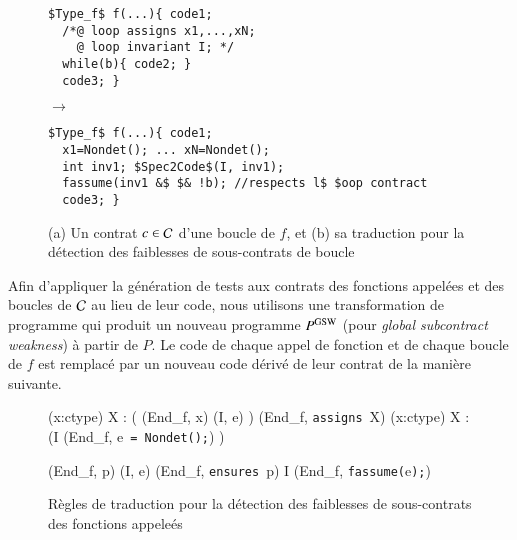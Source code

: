 \begin{figure*}[tb]
\begin{center}
\begin{minipage}{0.35\columnwidth}
\begin{lstlisting}[mathescape]
$Type_f$ f(...){ code1;
  /*@ loop assigns x1,...,xN;
    @ loop invariant I; */
  while(b){ code2; }
  code3; }
\end{lstlisting}
\end{minipage}
\hspace{-6mm}
\begin{minipage}{0.07\columnwidth}$\to$\end{minipage}
\begin{minipage}{0.55\columnwidth}
\begin{lstlisting}[mathescape]
$Type_f$ f(...){ code1;
  x1=Nondet(); ... xN=Nondet();
  int inv1; $Spec2Code$(I, inv1);
  fassume(inv1 &$ $& !b); //respects l$ $oop contract
  code3; }
\end{lstlisting}
\end{minipage}
\vspace{-3mm}
\caption{(a) Un contrat $c\in{\ensuremath\mathcal{C}}$ d'une boucle de $f$, et
(b) sa traduction pour la détection des faiblesses de sous-contrats de boucle}
\vspace{-3mm}
\label{fig:CW-transf-loops}
\end{center}
\end{figure*}

Afin d'appliquer la génération de tests aux contrats des fonctions appelées et
des boucles de ${\mathcal{C}}$ au lieu de leur code, nous utilisons une transformation de
programme qui produit un nouveau programme $P^{\mathrm{GSW}}$ (pour {\em global
subcontract weakness}) à partir de $P$.
Le code de chaque appel de fonction et de chaque boucle de $f$ est remplacé
par un nouveau code dérivé de leur contrat de la manière suivante.

\begin{figure}[tb]
  \scriptsize{
    {
      {
        \forall (x:ctype) \in X :
        (
        (End_f, x) \trule (I, e)
        )
      }
      {
        (End_f, \mbox{\lstinline'assigns'}~X\semicolon) \arule
        \forall (x:ctype) \in X :
        (I \concat (End_f,
        e~\mbox{\lstinline'= Nondet();'}) )
      }{}
    }

    {
      {(End_f, p) \prule (I, e)}
      {(End_f, \mbox{\lstinline'ensures'}~p\semicolon)
        \arule
        I \concat (End_f, \mbox{\lstinline'fassume('}e\mbox{\lstinline');'})}{}
    }
  }
  \caption{Règles de traduction pour la détection des faiblesses de
    sous-contrats des fonctions appeleés}
  \label{fig:assume-annot}
\end{figure}

